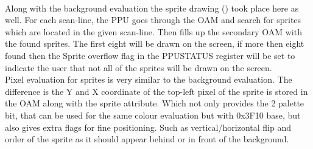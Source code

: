 \documentclass[]{report}
\begin{document}
\paragraph{ }
Along with the background evaluation the sprite drawing  (\cite{SRTE}) took place here as well. For each scan-line, the PPU goes through the OAM and search for sprites which are located in the given scan-line. Then fills up the secondary OAM with the found sprites. The first eight will be drawn on the screen, if more then eight found then the Sprite overflow flag in the PPUSTATUS register will be set to indicate the user that not all of the sprites will be drawn on the screen.
\\
Pixel evaluation for sprites is very similar to the background evaluation. The difference is the Y and X coordinate of the top-left pixel of the sprite is stored in the OAM along with the sprite attribute. Which not only provides the 2 palette bit, that can be used for the same colour evaluation but with 0x3F10 base, but also gives extra flags for fine positioning. Such as vertical/horizontal flip and order of the sprite as it should appear behind or in front of the background.
 
 
\end{document}
